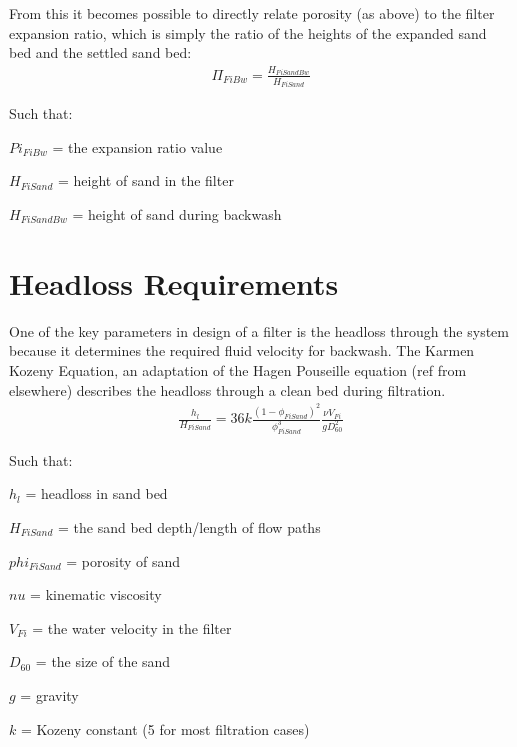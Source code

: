 \documentclass[letterpaper,10pt,english]{sphinxmanual}
\begin{document}
{From this it becomes possible to directly relate porosity (as above) to the filter expansion ratio, which is simply the ratio of the heights of the expanded sand bed and the settled sand bed:
\begin{equation}\label{equation:Filtration/Filtration_Design:filter_expansion_ratio}
\begin{split}\Pi_{FiBw} = \frac{H_{FiSandBw}}{H_{FiSand}}\end{split}
\end{equation}
\begin{DUlineblock}{0em}
\item[] Such that:
\item[] \(Pi_{FiBw}\) = the expansion ratio value
\item[] \(H_{FiSand}\) = height of sand in the filter
\item[] \(H_{FiSandBw}\) = height of sand during backwash
\end{DUlineblock}


\section{Headloss Requirements}
\label{\detokenize{Filtration/Filtration_Design:headloss-requirements}}\label{\detokenize{Filtration/Filtration_Design:heading-headloss-requirements}}
One of the key parameters in design of a filter is the headloss through the system because it determines the required fluid velocity for backwash. The Karmen Kozeny Equation, an adaptation of the Hagen Pouseille equation (ref from elsewhere) describes the headloss through a clean bed during filtration.
\begin{equation}\label{equation:Filtration/Filtration_Design:karmen_kozeny_clean_bed}
\begin{split}  \frac{h_l}{H_{FiSand}} = 36 k \frac{\left( 1 - \phi_{FiSand} \right)^2}{\phi_{FiSand}^3} \frac{\nu V_{Fi}}{g D_{60}^2}\end{split}
\end{equation}
\begin{DUlineblock}{0em}
\item[] Such that:
\item[] \(h_l\) = headloss in sand bed
\item[] \(H_{FiSand}\) = the sand bed depth/length of flow paths
\item[] \(phi_{FiSand}\) = porosity of sand
\item[] \(nu\) = kinematic viscosity
\item[] \(V_{Fi}\) = the water velocity in the filter
\item[] \(D_{60}\) = the size of the sand
\item[] \(g\) = gravity
\item[] \(k\) = Kozeny constant (5 for most filtration cases)
\end{DUlineblock}

}
\end{document}

